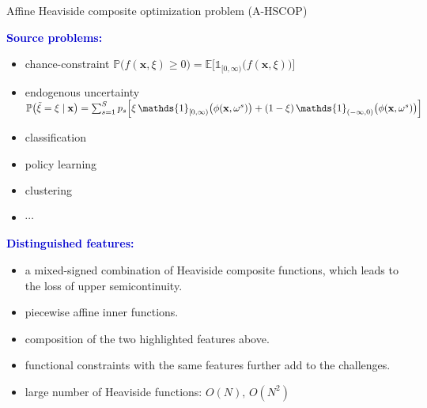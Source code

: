 \documentclass[aspectratio=169,xcolor=dvipsnames]{beamer}
\begin{document}
\begin{frame}{Affine Heaviside composite optimization problem (A-HSCOP)}
  \footnotesize
  \setlength{\abovedisplayskip}{3pt}
  \setlength{\belowdisplayskip}{3pt}

  \textcolor{MediumBlue}{\textbf{Source problems:}}
  \begin{itemize}
    \setlength{\itemsep}{0.05cm}
    \item chance-constraint $\mathbb{P}\bigl(f(\mathbf{x},\xi)\geq 0\bigr)
      =\mathbb{E}\bigl[\mathds{1}_{[0,\infty)}\bigl(f(\mathbf{x},\xi)\bigr)\bigr]$
    \item endogenous uncertainty
      $\mathbb{P}\bigl(\tilde{\xi}=\xi\mid\mathbf{x}\bigr)
      =\sum_{s=1}^{S}p_s\Bigl[\xi\,\mathds{1}_{[0,\infty)}
      \bigl(\phi(\mathbf{x},\omega^s)\bigr)
      +(1-\xi)\,\mathds{1}_{(-\infty,0)}\bigl(\phi(\mathbf{x},\omega^s)\bigr)\Bigr]$
    \item \textcolor{MediumRed}{classification}
    \item \textcolor{MediumRed}{policy learning}
    \item \textcolor{MediumRed}{clustering}
    \item[] $\cdots$
  \end{itemize}

  \vspace{0.05cm}
  \textcolor{MediumBlue}{\textbf{Distinguished features:}}
  \begin{itemize}
    \setlength{\itemsep}{0.05cm}
    \item a \textcolor{MediumRed}{mixed-signed combination} of Heaviside
      composite functions, which leads to the loss of upper semicontinuity.
    \item \textcolor{MediumRed}{piecewise affine inner functions.}
    \item \textcolor{MediumRed}{composition of the two highlighted features
      above.}
    \item \textcolor{MediumRed}{functional constraints} with the same features
      further add to the challenges.
    \item large number of Heaviside functions: $O(N),\,O(N^2)$
  \end{itemize}
\end{frame}
\end{document}
